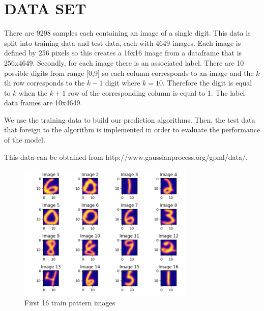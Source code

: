 \documentclass[dvipsnames,12pt]{article} %
\begin{document}

  \section{DATA SET}
    \label{SECT 02:DATA}

      \vspace{06pt}

      There are 9298 samples each containing an image of a single digit. This data is split into training data and test data, each with 4649 images. Each image is defined by 256 pixels so this creates a 16x16 image from a dataframe that is 256x4649. Secondly, for each image there is an associated label. There are 10 possible digits from range [0,9] so each column corresponds to an image and the $k$th row corresponds to the $k-1$ digit where $k=10$. Therefore the digit is equal to $k$ when the $k+1$ row of the corresponding column is equal to 1. The label data frames are 10x4649.

      \vspace{06pt}


        \vspace{06pt}
        
        We use the training data to build our prediction algorithms. Then, the test data that foreign to the algorithm is implemented in order to evaluate the performance of the model.

        \vspace{06pt}
        
        This data can be obtained from http://www.gaussianprocess.org/gpml/data/.
        
        \vspace{06pt}
        \newpage

        \begin{figure}[h!]
	\centering
	\includegraphics[width = 0.75\textwidth]{FPPFigure_1.png}
	\caption{First 16 train pattern images}
	\label{fig: FIG 01}
\end{figure}
\end{document}
